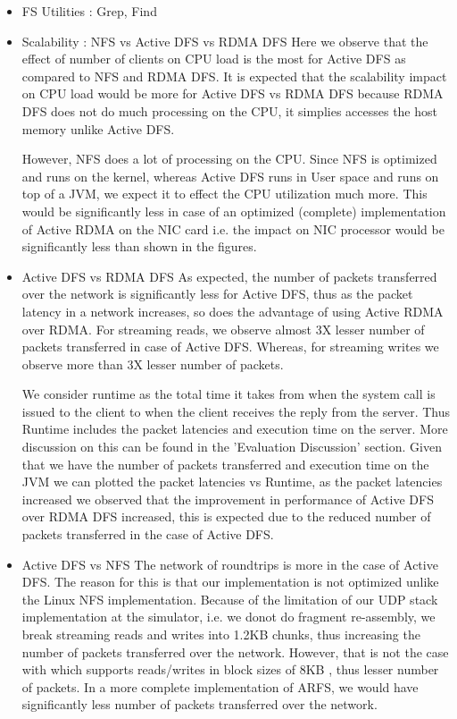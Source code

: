 \documentclass[10pt]{article}
\begin{document}
\begin{itemize}
\item FS Utilities : Grep, Find

\item Scalability : NFS vs Active DFS vs RDMA DFS
Here we observe that the effect of number of clients on CPU load is the most for Active DFS as compared to NFS and RDMA DFS. It is expected that the scalability impact on CPU load would be more for Active DFS vs RDMA DFS because RDMA DFS does not do much processing on the CPU, it simplies accesses the host memory unlike Active DFS. 

However, NFS does a lot of processing on the CPU. Since NFS is optimized and runs on the kernel, whereas Active DFS runs in User space and runs on top of a JVM, we expect it to effect the CPU utilization much more. This would be significantly less in case of an optimized (complete) implementation of Active RDMA on the NIC card i.e. the impact on NIC processor would be significantly less than shown in the figures. 
\item Active DFS vs RDMA DFS
As expected, the number of packets transferred over the network is significantly less for Active DFS, thus as the packet latency in a network increases, so does the advantage of using Active RDMA over RDMA. For streaming reads, we observe almost 3X lesser number of packets transferred in case of Active DFS. Whereas, for streaming writes we observe more than 3X lesser number of packets.

We consider runtime as the total time it takes from when the system call is issued to the client to when the client receives the reply from the server. Thus Runtime includes the packet latencies and execution time on the server. More discussion on this can be found in the 'Evaluation Discussion' section. Given that we have the number of packets transferred and execution time on the JVM we can plotted the packet latencies vs Runtime, as the packet latencies increased we observed that the improvement in performance of Active DFS over RDMA DFS increased, this is expected due to the reduced number of packets transferred in the case of Active DFS.
\item Active DFS vs NFS
The network of roundtrips is more in the case of Active DFS. The reason for this is that our implementation is not optimized unlike the Linux NFS implementation. Because of the limitation of our UDP stack implementation at the simulator, i.e. we donot do fragment re-assembly, we break streaming reads and writes into 1.2KB chunks, thus increasing the number of packets transferred over the network. However, that is not the case with which supports reads/writes in block sizes of 8KB , thus lesser number of packets. In a more complete implementation of ARFS, we would have significantly less number of packets transferred over the network.
\end{itemize}
\end{document}
